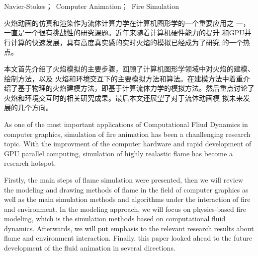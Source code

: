 {Navier-Stokes；\ Computer Animation；\ Fire Simulation}

\begin{abstract_ch}
  火焰动画的仿真和渲染作为流体计算力学在计算机图形学的一个重要应用之
  一，一直是一个很有挑战性的研究课题。近年来随着计算机硬件能力的提升
  和GPU并行计算的快速发展，具有高度真实感的实时火焰的模拟已经成为了研究
  的一个热点。

  本文首先介绍了火焰模拟的主要步骤，回顾了计算机图形学领域中对火焰的建模、绘制方法，以及
  火焰和环境交互下的主要模拟方法和算法。在建模方法中着重介绍了基于物理的火焰建模方法，即基于计算流体力学的模拟方法。然后重点讨论了火焰和环境交互时的相关研究成果。最后本文还展望了对于流体动画模
  拟未来发展的几个方向。
\end{abstract_ch}

\begin{abstract_en}
  As one of the most important applications of Computational Fliud
  Dynamics in computer graphics, simulation of fire animation has been
  a chanllenging research topic. With the improvment of the computer
  hardware and rapid development of GPU parallel computing, simulation
  of highly realastic flame has become a research hotspot.


 Firstly, the main steps of flame simulation were presented, then we
will review the modeling and drawing methods of flame in the field of
computer graphics as well as the main simulation methods and
algorithms under the interaction of fire and environment. In the
modeling approach, we will focus on physics-based fire modeling, which
is the simulation methods based on computational fluid dynamics.
Afterwards, we will put emphasis to the relevant research results
about flame and environment interaction. Finally, this paper looked
ahead to the future development of the fluid animation in several
directions.

\end{abstract_en}
\newpage
